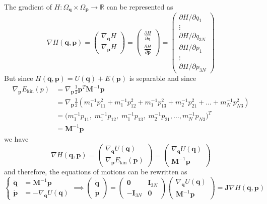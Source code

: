 \documentclass{article}
\begin{document}
    The gradient of $H: \Omega_\mathbf{q} \times \Omega_\mathbf{p} \longrightarrow \mathbb{R}$ can be represented as 
    \[\nabla H(\mathbf{q}, \mathbf{p}) = 
    \begin{pmatrix} \nabla_\mathbf{q} H \\[1mm] \nabla_\mathbf{p} H \end{pmatrix} =
    \begin{pmatrix} \frac{\partial H}{\partial \mathbf{q}} \\[2mm] \frac{\partial H}{\partial \mathbf{p}} \end{pmatrix} = 
    \begin{pmatrix} \partial H / \partial q_1 \\ \vdots \\ \partial H / \partial q_{3N} \\ \partial H / \partial p_1 \\ \vdots \\ \partial H / \partial p_{3N} \end{pmatrix} \]
    But since $H(\mathbf{q}, \mathbf{p}) = U(\mathbf{q}) + E (\mathbf{p})$ is separable and since 
    \begin{align*}
        \nabla_\mathbf{p} E_\mathrm{kin}(p) & = \nabla_\mathbf{p} \frac{1}{2} \mathbf{p}^T \mathbf{M}^{-1} \mathbf{p} \\
        & = \nabla_\mathbf{p} \frac{1}{2} (m_1^{-1} p_{11}^2 + m_1^{-1} p_{12}^2 + m_1^{-1} p_{13}^2 + m_2^{-1} p_{21}^2 + \ldots + m_N^{-1} p_{N3}^2) \\
        & = \big(m_1^{-1} p_{11}, \;m_1^{-1} p_{12}, \;m_1^{-1} p_{13}, \;m_2^{-1} p_{21}, \ldots, m_N^{-1} p_{N3} \big)^T \\
        & = \mathbf{M}^{-1} \mathbf{p} 
    \end{align*}
    we have 
    \[\nabla H(\mathbf{q}, \mathbf{p}) = \begin{pmatrix} \nabla_\mathbf{q} U (\mathbf{q})\\ \nabla_\mathbf{p} E_\mathrm{kin} (\mathbf{p}) \end{pmatrix} = \begin{pmatrix} \nabla_\mathbf{q} U (\mathbf{q})\\ \mathbf{M}^{-1} \mathbf{p} \end{pmatrix} \]
    and therefore, the equations of motions can be rewritten as 
    \[\begin{cases} \boldsymbol{\dot{q}} & = \mathbf{M}^{-1} \mathbf{p} \\
    \boldsymbol{\dot{p}} & = - \nabla_\mathbf{q} U(\mathbf{q}) \end{cases} \implies \begin{pmatrix} \boldsymbol{\dot{q}} \\ \boldsymbol{\dot{p}} \end{pmatrix} = \begin{pmatrix} \mathbf{0} & \mathbf{I}_{3N} \\ -\mathbf{I}_{3N} & \mathbf{0} \end{pmatrix} \begin{pmatrix} \nabla_\mathbf{q} U (\mathbf{q})\\ \mathbf{M}^{-1} \mathbf{p} \end{pmatrix} = \mathbf{J} \nabla H(\mathbf{q}, \mathbf{p})\]
\end{document}
